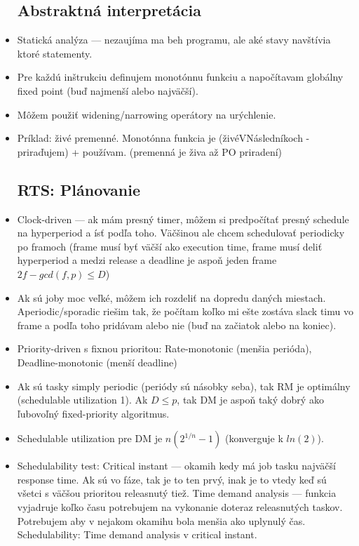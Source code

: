\documentclass[paper=a4, fontsize=11pt]{scrartcl} %
\numberwithin{equation}{section} %
\numberwithin{figure}{section} %
\numberwithin{table}{section} %
\begin{document}
\begin{itemize}
	\subsection{Abstraktná interpretácia}
	
	\item Statická analýza — nezaujíma ma beh programu, ale aké stavy navštívia ktoré statementy.
	
	\item Pre každú inštrukciu definujem monotónnu funkciu a napočítavam globálny fixed point (buď najmenší alebo najväčší).
	
	\item Môžem použiť widening/narrowing operátory na urýchlenie.
	
	\item Príklad: živé premenné. Monotónna funkcia je (živéVNásledníkoch - priraďujem) + používam. (premenná je živa až PO priradení)
	
	\subsection{RTS: Plánovanie}
	
	\item Clock-driven — ak mám presný timer, môžem si predpočítať presný schedule na hyperperiod a ísť podľa toho. Väčšinou ale chcem schedulovať periodicky po framoch (frame musí byť väčší ako execution time, frame musí deliť hyperperiod a medzi release a deadline je aspoň jeden frame $2f - gcd(f,p) \leq D$)
	
	\item Ak sú joby moc veľké, môžem ich rozdeliť na dopredu daných miestach. Aperiodic/sporadic riešim tak, že počítam koľko mi ešte zostáva slack timu vo frame a podľa toho pridávam alebo nie (buď na začiatok alebo na koniec).
	
	\item Priority-driven s fixnou prioritou: Rate-monotonic (menšia perióda), Deadline-monotonic (menší deadline)
	
	\item Ak sú tasky simply periodic (periódy sú násobky seba), tak RM je optimálny (schedulable utilization 1). Ak $D \leq p$, tak DM je aspoň taký dobrý ako ľubovoľný fixed-priority algoritmus.
	
	\item Schedulable utilization pre DM je $n(2^{1/n} - 1)$ (konverguje k $ln(2)$).
	
	\item Schedulability test: Critical instant — okamih kedy má job tasku najväčší response time. Ak sú vo fáze, tak je to ten prvý, inak je to vtedy keď sú všetci s väčšou prioritou releasnutý tiež. Time demand analysis — funkcia vyjadruje koľko času potrebujem na vykonanie doteraz releasnutých taskov. Potrebujem aby v nejakom okamihu bola menšia ako uplynulý čas. Schedulability: Time demand analysis v critical instant.
	

\end{itemize}
\end{document}
